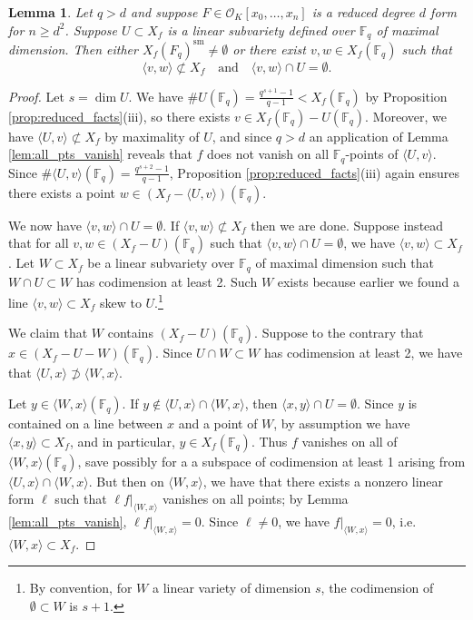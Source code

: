 \documentclass{amsart}
\newcommand{\F}{\mathbb{F}}
\renewcommand{\O}{\mathcal{O}}
\newcommand{\Span}[1]{\langle #1 \rangle}
\newcommand{\sm}{\mathrm{sm}}
\newtheorem{lemma}[theorem]{Lemma}
\theoremstyle{definition}
\numberwithin{equation}{section}
\numberwithin{table}{section}
\newcommand{\qbound}[1]{{\color{cyan}$q > {#1}$}}
\renewcommand{\qbound}[1]{{$q > {#1}$}}
\begin{document}
\begin{lemma}
\label{lem:skew_points}
    Let \qbound{d} and suppose $F \in \O_K[x_0, \ldots, x_n]$ is a reduced degree $d$ form for $n \geq d^2$. Suppose $U \subset X_f$ is a linear subvariety defined over $\F_q$ of maximal dimension. Then either $X_f(F_q)^{\sm} \neq \emptyset$ or there exist $v,w \in X_f(\F_q)$ such that 
    \[\Span{v,w} \not\subset X_f \quad\text{and}\quad \Span{v,w} \cap U = \emptyset.\]
\end{lemma}

\begin{proof}
    Let $s = \dim U$. We have $\#U(\F_q) = \frac{q^{s+1}-1}{q-1} < X_f(\F_q)$ by Proposition \ref{prop:reduced_facts}(iii), so there exists $v \in X_f(\F_q) - U(\F_q)$. Moreover, we have $\Span{U,v} \not \subset X_f$ by maximality of $U$, and since \qbound{d} an application of Lemma \ref{lem:all_pts_vanish} reveals that $f$ does not vanish on all $\F_q$-points of $\Span{U,v}$. Since $\#\Span{U,v}(\F_q) = \frac{q^{s+2} - 1}{q-1}$, Proposition \ref{prop:reduced_facts}(iii) again ensures there exists a point $w \in (X_f - \Span{U,v})(\F_q)$.

    We now have $\Span{v,w} \cap U = \emptyset$. If $\Span{v,w} \not\subset X_f$ then we are done. Suppose instead that for all $v,w \in (X_f - U)(\F_q)$ such that $\Span{v,w} \cap U = \emptyset$, we have $\Span{v,w} \subset X_f$. Let $W \subset X_f$ be a linear subvariety over $\F_q$ of maximal dimension such that $W \cap U \subset W$ has codimension at least 2. Such $W$ exists because earlier we found a line $\Span{v,w} \subset X_f$ skew to $U$.\footnote{By convention, for $W$ a linear variety of dimension $s$, the codimension of $\emptyset \subset W$ is $s+1$.}

    We claim that $W$ contains $(X_f - U)(\F_q)$. Suppose to the contrary that $x \in (X_f - U - W)(\F_q)$. Since $U \cap W \subset W$ has codimension at least 2, we have that $\Span{U,x} \not\supset \Span{W,x}$. 

    Let $y \in \Span{W,x}(\F_q)$. If $y \notin \Span{U,x} \cap \Span{W,x}$, then $\Span{x,y} \cap U = \emptyset$. Since $y$ is contained on a line between $x$ and a point of $W$, by assumption we have $\Span{x,y} \subset X_f$, and in particular, $y \in X_f(\F_q)$. Thus $f$ vanishes on all of $\Span{W,x}(\F_q)$, save possibly for a a subspace of codimension at least 1 arising from $\Span{U,x} \cap \Span{W,x}$. But then on $\Span{W,x}$, we have that there exists a nonzero linear form $\ell$ such that $\ell f|_{\Span{W,x}}$ vanishes on all points; by Lemma \ref{lem:all_pts_vanish}, $\ell f|_{\Span{W,x}} = 0$. Since $\ell \neq 0$, we have $f|_{\Span{W,x}} = 0$, i.e.\ $\Span{W,x} \subset X_f$. 
    

\end{proof}
\end{document}
